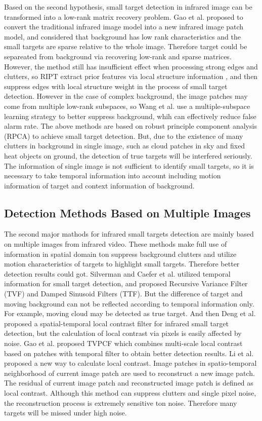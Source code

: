\documentclass[journal]{IEEEtran}
\begin{document}
Based on the second hypothesis, small target detection in infrared image can be transformed into a low-rank matrix recovery problem. Gao\cite{gao2013infrared} et al. proposed to convert the traditional infrared image model into a new infrared image patch model, and considered that background has low rank characteristics and the small targets are sparse relative to the whole image. Therefore target could be separeated from background via recovering low-rank and sparse matrices. However, the method still has insufficient effect when processing strong edges and clutters, so RIPT\cite{dai2017reweighted} extract prior features via local structure information , and then suppress edges with local structure weight in the process of small target detection. However in the case of complex background, the image patches may come from multiple low-rank subspaces, so Wang\cite{wang2017infrared} et al. use a multiple-subspace learning strategy to better suppress background, whih can effectively reduce false alarm rate. The above methods are based on robust principle component analysis (RPCA) to achieve small target detection. But, due to the existence of many clutters in background in single image, such as cloud patches in sky and fixed heat objects on ground, the detection of true targets will be interfered seriously. The information of single image is not sufficient to identify small targets, so it is necessary to take temporal information into account including motion information of target and context information of background.

\subsection{Detection Methods Based on Multiple Images}
The second major mathods for infrared small targets detection are mainly based on multiple images from infrared video. These methods make full use of information in spatial domain ton suppress background clutters and utilize motion characteristics of targets to highlight small targets. Therefore better detection results could got. Silverman and Caefer et al. utilized temporal information for small target detection, and proposed Recursive Variance Filter (TVF)\cite{silverman1998temporal} and Damped Sinusoid Filters (TTF)\cite{caefer1998temporal}. But the difference of target and moving background can not be reflected according to temporal information only. For example, moving cloud may be detected as true target. And then Deng et al.\cite{deng2016infrared} proposed a spatial-temporal local contrast filter for infrared small target detection, but the calculation of local contrast via pixels is easily affected by noise. Gao et al. proposed TVPCF\cite{gao2017tvpcf} which combines multi-scale local contrast based on patches with temporal filter to obtain better detection results. Li et al.\cite{li2016novel} proposed a new way to calculate local contrast. Image patches in spatio-temporal neighborhood of current image patch are used to reconstruct a new image patch. The residual of current image patch and reconstructed image patch is defined as local contrast. Although this method can suppress clutters and single pixel noise, the reconstruction process is extremely sensitive ton noise. Therefore many targets will be missed under high noise.
\end{document}
